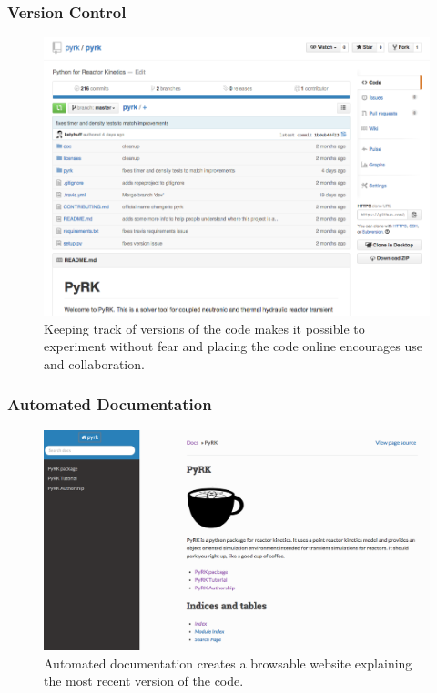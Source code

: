 \begin{frame}[fragile]
  \frametitle{Version Control}
  \begin{figure}[htbp!]
    \begin{center}
      \includegraphics[height=0.7\textheight]{./progress/github_pyrk.png}
    \end{center}
    \caption{Keeping track of versions of the code makes it possible to 
    experiment without fear and placing the code online encourages use and 
    collaboration.}
    \label{fig:doc_pyrk}
  \end{figure}
\end{frame}

\begin{frame}[fragile]
  \frametitle{Automated Documentation}
  \begin{figure}[htbp!]
    \begin{center}
      \includegraphics[height=0.7\textheight]{./progress/doc_pyrk.png}
    \end{center}
    \caption{Automated documentation creates a browsable website explaining the most recent version of the code.}
    \label{fig:doc_pyrk}
  \end{figure}
\end{frame}

